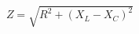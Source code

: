 \documentclass[preview]{standalone}
\begin{document}
\begin{align*}
Z = \sqrt{ R^2 + ( X_L - X_C )^2}
\end{align*}
\end{document}
